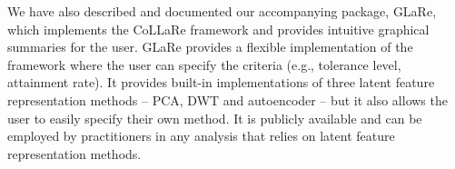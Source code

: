 We have also described and documented our accompanying  package, GLaRe, which implements the CoLLaRe framework and provides intuitive graphical summaries for the user.
GLaRe provides a flexible implementation of the framework where the user can specify the criteria (e.g., tolerance level, attainment rate).
It provides built-in implementations of three latent feature representation methods -- PCA, DWT and autoencoder -- but it also allows the user to easily specify their own method.
It is publicly available and can be employed by practitioners in any analysis that relies on latent feature representation methods.





